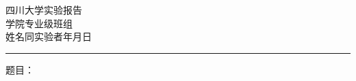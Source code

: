 \documentclass[a4paper,12pt]{article}
\makeatletter
\def\vhrulefill#1{\leavevmode\leaders\hrule\@height#1\hfill \kern\z@}
\makeatother
\begin{document}
    \begin{center}
        四川大学实验报告 \\
        \vspace{1em}
        学\hspace{1em}院\hspace{9em}专\hspace{2em}业\hspace{9em}级\hspace{1em}班\hspace{1em}组\\
        \vspace{0.5em}
        姓\hspace{1em}名\hspace{9em}同实验者\hspace{9em}年\hspace{1em}月\hspace{1em}日\\
        \vhrulefill{2pt}
    \end{center}
    题\hspace{1em}目：
\end{document}
